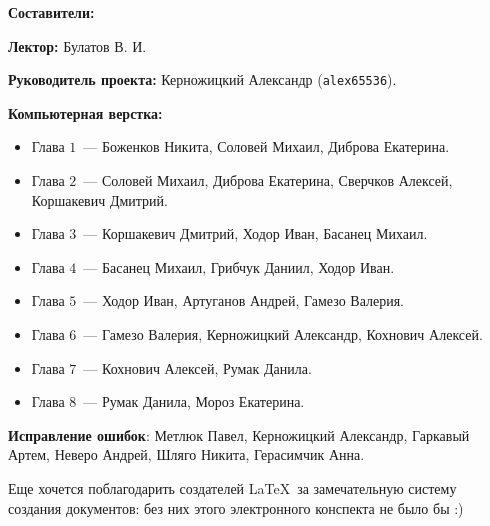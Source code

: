 \documentclass[../main.tex]{subfiles}
\begin{document}
{\Huge \bf Составители:}

\vspace{2em}

{
    \textbf{Лектор:} Булатов В. И.
    
    \smallskip
    
    \textbf{Руководитель проекта:} Керножицкий Александр 
    (\texttt{alex65536}).
    
    \smallskip
    
    \textbf{Компьютерная верстка:}
    \begin{itemize}
     \item Глава $1$~--- Боженков Никита, Соловей Михаил, Диброва Екатерина.
     \item Глава $2$~--- Соловей Михаил, Диброва Екатерина, Сверчков Алексей,
     Коршакевич Дмитрий.
     \item Глава $3$~--- Коршакевич Дмитрий, Ходор Иван, Басанец Михаил.
     \item Глава $4$~--- Басанец Михаил, Грибчук Даниил, Ходор Иван.
     \item Глава $5$~--- Ходор Иван, Артуганов Андрей, Гамезо Валерия.
     \item Глава $6$~--- Гамезо Валерия, Керножицкий Александр,
     Кохнович Алексей.
     \item Глава $7$~--- Кохнович Алексей, Румак Данила.
     \item Глава $8$~--- Румак Данила, Мороз Екатерина.
    \end{itemize}
    
    \textbf{Исправление ошибок}: Метлюк Павел, Керножицкий Александр, Гаркавый
    Артем, Неверо Андрей, Шляго Никита, Герасимчик Анна.
    
    
    \smallskip
    
    Еще хочется поблагодарить создателей \LaTeX\ за замечательную 
    систему создания документов: без них этого электронного 
    конспекта не было бы :)
}

\pagebreak
\end{document}
